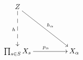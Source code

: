 \documentclass{standalone}
\begin{document}
\Large
\(\displaystyle
\xymatrix@C+24pt@R+24pt{
 Z 
\ar@{-->}[d]_{h} 
\ar[dr]^{h_\alpha} 
  &  \\
\prod_{s \in S} X_s
\ar[r]^{p_\alpha}  
& 
X_\alpha  
  \\
}
\)
\end{document}
